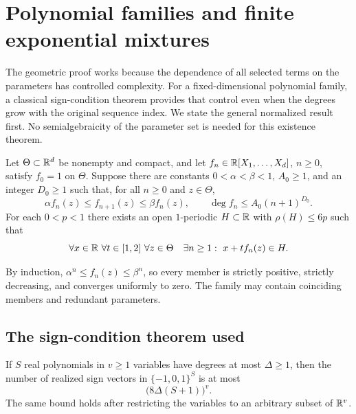 \section{Polynomial families and finite exponential mixtures}
\label{sec:algebraic}

The geometric proof works because the dependence of all selected terms
on the parameters has controlled complexity. For a fixed-dimensional
polynomial family, a classical sign-condition theorem provides that
control even when the degrees grow with the original sequence index.
We state the general normalized result first. No semialgebraicity of
the parameter set is needed for this existence theorem.

\begin{theorem}\label{thm:poly-family}
Let $\Theta\subset\mathbb R^d$ be nonempty and compact, and let
$f_n\in\mathbb R[X_1,\ldots,X_d]$, $n\ge0$, satisfy $f_0=1$ on $\Theta$.
Suppose there are constants $0<\alpha<\beta<1$, $A_0\ge1$, and
an integer $D_0\ge1$ such that, for all $n\ge0$ and $z\in\Theta$,
\begin{equation}\label{eq:family-assumptions}
 \alpha f_n(z)\le f_{n+1}(z)\le\beta f_n(z),
 \qquad \deg f_n\le A_0(n+1)^{D_0}.
\end{equation}
For each $0<p<1$ there exists an open $1$-periodic $H\subset\mathbb R$
with $\rho(H)\le6p$ such that
\begin{equation}\label{eq:family-hit}
 \forall x\in\mathbb R\ \forall t\in[1,2]\ \forall z\in\Theta
 \quad \exists n\ge1:\ x+tf_n(z)\in H.
\end{equation}
\end{theorem}

By induction, $\alpha^n\le f_n(z)\le\beta^n$, so every member
is strictly positive, strictly decreasing, and converges uniformly to
zero. The family may contain coinciding members and redundant
parameters.

\subsection{The sign-condition theorem used}

\begin{lemma}\label{lem:signs}
If $S$ real polynomials in $v\ge1$ variables have degrees at most
$\Delta\ge1$, then the number of realized sign vectors in
$\{-1,0,1\}^S$ is at most
\begin{equation}\label{eq:sign-bound}
 \bigl(8\Delta(S+1)\bigr)^v.
\end{equation}
The same bound holds after restricting the variables to an arbitrary
subset of $\mathbb R^v$.
\end{lemma}

